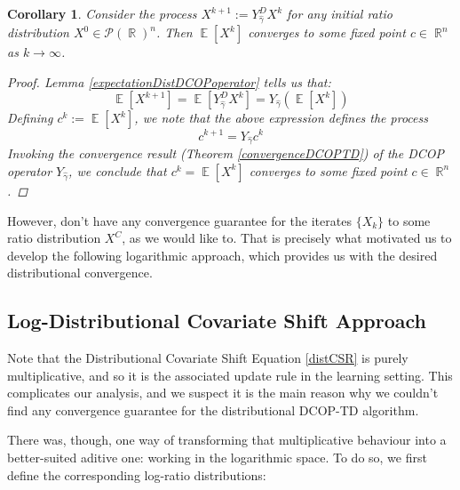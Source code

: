 \documentclass[12pt,a4paper,openright,twoside]{article}
\DeclareMathOperator*{\E}{\mathbb{E}}
\DeclareMathOperator*{\R}{\mathbb{R}}
\numberwithin{equation}{section}
\newtheorem{corol}[theorem]{Corollary}
\theoremstyle{definition}
\theoremstyle{remark}
\theoremstyle{plain}
\begin{document}
\begin{corol} \label{convergenceExpectationDistDCOP}
	Consider the process $X^{k+1} := Y^D_{\hat{\gamma}} X^k$ for any initial ratio distribution $X^0 \in \mathcal{P}(\R)^n$. Then $\E[X^{k}]$ converges to some fixed point $c \in \R^n$ as $k \rightarrow \infty$.
	
	\begin{proof}
		Lemma \ref{expectationDistDCOPoperator} tells us that:
		\begin{equation*}
			\E [X^{k+1}] = \E [Y^D_{\hat{\gamma}} X^{k}] = Y_{\hat{\gamma}} (\E [X^k])
		\end{equation*}
		Defining $c^k := \E [X^k]$, we note that the above expression defines the process 
		\begin{equation*}
			c^{k+1} = Y_{\hat{\gamma}} c^k 
		\end{equation*}
		Invoking the convergence result (Theorem \ref{convergenceDCOPTD}) of the DCOP operator $Y_{\hat{\gamma}}$, we conclude that $c^k = \E[X^{k}]$ converges to some fixed point $c \in \R^n$. 
	\end{proof}
\end{corol}

However, don't have any convergence guarantee for the iterates $\{X_k\}$ to some ratio distribution $X^C$, as we would like to. That is precisely what motivated us to develop the following logarithmic approach, which provides us with the desired distributional convergence.


\subsection{Log-Distributional Covariate Shift Approach}

Note that the Distributional Covariate Shift Equation \ref{distCSR} is purely multiplicative, and so it is the associated update rule in the learning setting. This complicates our analysis, and we suspect it is the main reason why we couldn't find any convergence guarantee for the distributional DCOP-TD algorithm.

There was, though, one way of transforming that multiplicative behaviour into a better-suited aditive one: working in the logarithmic space. To do so, we first define the corresponding log-ratio distributions:
\end{document}
